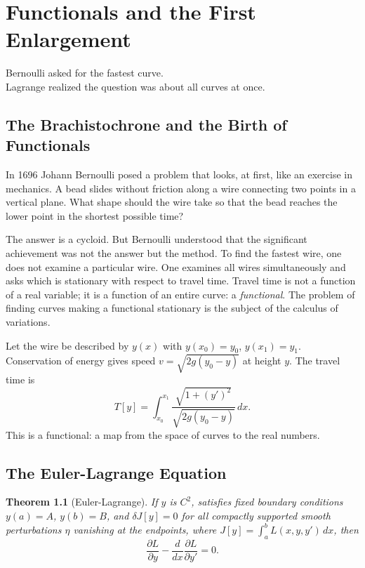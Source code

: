\documentclass[12pt,oneside]{book}
\theoremstyle{plain}
\newtheorem{theorem}{Theorem}[chapter]
\theoremstyle{definition}
\theoremstyle{remark}
\begin{document}
\chapter{Functionals and the First Enlargement}

\epigraph{Bernoulli asked for the fastest curve.\\
Lagrange realized the question was about all curves at once.}{}

\section{The Brachistochrone and the Birth of Functionals}

In 1696 Johann Bernoulli posed a problem that looks, at first, like an
exercise in mechanics. A bead slides without friction along a wire connecting
two points in a vertical plane. What shape should the wire take so that the
bead reaches the lower point in the shortest possible time?

The answer is a cycloid. But Bernoulli understood that the significant
achievement was not the answer but the method. To find the fastest wire,
one does not examine a particular wire. One examines all wires simultaneously
and asks which is stationary with respect to travel time. Travel time is not
a function of a real variable; it is a function of an entire curve: a
\emph{functional}. The problem of finding curves making a functional stationary
is the subject of the calculus of variations.

Let the wire be described by $y(x)$ with $y(x_0) = y_0$, $y(x_1) = y_1$.
Conservation of energy gives speed $v = \sqrt{2g(y_0 - y)}$ at height $y$.
The travel time is
\[
  T[y] = \int_{x_0}^{x_1}
  \frac{\sqrt{1 + (y')^2}}{\sqrt{2g(y_0 - y)}}\, dx.
\]
This is a functional: a map from the space of curves to the real numbers.

\section{The Euler-Lagrange Equation}

\begin{theorem}[Euler-Lagrange]
\label{thm:EL}
If $y$ is $C^2$, satisfies fixed boundary conditions $y(a) = A$, $y(b) = B$,
and $\delta J[y] = 0$ for all compactly supported smooth perturbations $\eta$
vanishing at the endpoints, where $J[y] = \int_a^b L(x, y, y')\, dx$, then
\[
  \frac{\partial L}{\partial y}
  - \frac{d}{dx}\frac{\partial L}{\partial y'} = 0.
\]
\end{theorem}
\end{document}

